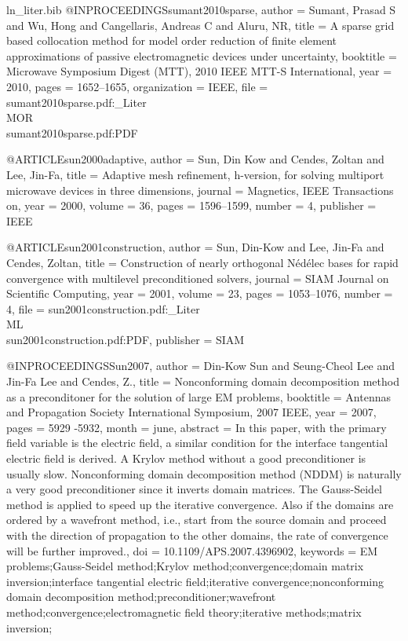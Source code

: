 \begin{filecontents*}{ln_liter.bib}
@INPROCEEDINGS{sumant2010sparse,
  author = {Sumant, Prasad S and Wu, Hong and Cangellaris, Andreas C and Aluru,
	NR},
  title = {A sparse grid based collocation method for model order reduction
	of finite element approximations of passive electromagnetic devices
	under uncertainty},
  booktitle = {Microwave Symposium Digest (MTT), 2010 IEEE MTT-S International},
  year = {2010},
  pages = {1652--1655},
  organization = {IEEE},
  file = {sumant2010sparse.pdf:_Liter\\MOR\\sumant2010sparse.pdf:PDF}
}

@ARTICLE{sun2000adaptive,
  author = {Sun, Din Kow and Cendes, Zoltan and Lee, Jin-Fa},
  title = {Adaptive mesh refinement, h-version, for solving multiport microwave
	devices in three dimensions},
  journal = {Magnetics, IEEE Transactions on},
  year = {2000},
  volume = {36},
  pages = {1596--1599},
  number = {4},
  publisher = {IEEE}
}

@ARTICLE{sun2001construction,
  author = {Sun, Din-Kow and Lee, Jin-Fa and Cendes, Zoltan},
  title = {Construction of nearly orthogonal {N{\'e}d{\'e}lec} bases for rapid convergence
	with multilevel preconditioned solvers},
  journal = {SIAM Journal on Scientific Computing},
  year = {2001},
  volume = {23},
  pages = {1053--1076},
  number = {4},
  file = {sun2001construction.pdf:_Liter\\ML\\sun2001construction.pdf:PDF},
  publisher = {SIAM}
}

@INPROCEEDINGS{Sun2007,
  author = {Din-Kow Sun and Seung-Cheol Lee and Jin-Fa Lee and Cendes, Z.},
  title = {Nonconforming domain decomposition method as a preconditoner for
	the solution of large {EM} problems},
  booktitle = {Antennas and Propagation Society International Symposium, 2007 IEEE},
  year = {2007},
  pages = {5929 -5932},
  month = {june},
  abstract = {In this paper, with the primary field variable is the electric field,
	a similar condition for the interface tangential electric field is
	derived. A Krylov method without a good preconditioner is usually
	slow. Nonconforming domain decomposition method (NDDM) is naturally
	a very good preconditioner since it inverts domain matrices. The
	Gauss-Seidel method is applied to speed up the iterative convergence.
	Also if the domains are ordered by a wavefront method, i.e., start
	from the source domain and proceed with the direction of propagation
	to the other domains, the rate of convergence will be further improved.},
  doi = {10.1109/APS.2007.4396902},
  keywords = {EM problems;Gauss-Seidel method;Krylov method;convergence;domain matrix
	inversion;interface tangential electric field;iterative convergence;nonconforming
	domain decomposition method;preconditioner;wavefront method;convergence;electromagnetic
	field theory;iterative methods;matrix inversion;}
}


\end{filecontents*}
